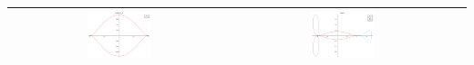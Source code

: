 \documentclass[a4paper,10pt]{article}
\begin{document}
\begin{table}[!ht]
\begin{tabular}{|c|c|c|}
  \includegraphics[width=0.3\textwidth]{PT_3_zed_C0_1-3.png} &
  \includegraphics[width=0.3\textwidth]{PT_3_zed_1-3.png} \\ \hline
 \end{tabular}
 \end{table}
 
\end{document}
